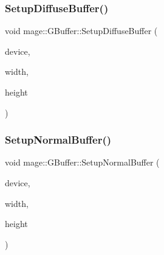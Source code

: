 \hypertarget{structmage_1_1_g_buffer_a80672c9a8faebe7c00e26040e19d03b8}{}\label{structmage_1_1_g_buffer_a80672c9a8faebe7c00e26040e19d03b8} 
\subsubsection{\texorpdfstring{Setup\+Diffuse\+Buffer()}{SetupDiffuseBuffer()}}
{\footnotesize\ttfamily void mage\+::\+G\+Buffer\+::\+Setup\+Diffuse\+Buffer (\begin{DoxyParamCaption}\item[{I\+D3\+D11\+Device2 $\ast$}]{device,  }\item[{\hyperlink{namespacemage_af2b398bf98eb10351f49cad73fe2cc73}{u32}}]{width,  }\item[{\hyperlink{namespacemage_af2b398bf98eb10351f49cad73fe2cc73}{u32}}]{height }\end{DoxyParamCaption})\hspace{0.3cm}{\ttfamily [private]}}

\hypertarget{structmage_1_1_g_buffer_a04f953ae48d8732d5dd6df24daf70f5a}{}\label{structmage_1_1_g_buffer_a04f953ae48d8732d5dd6df24daf70f5a} 
\subsubsection{\texorpdfstring{Setup\+Normal\+Buffer()}{SetupNormalBuffer()}}
{\footnotesize\ttfamily void mage\+::\+G\+Buffer\+::\+Setup\+Normal\+Buffer (\begin{DoxyParamCaption}\item[{I\+D3\+D11\+Device2 $\ast$}]{device,  }\item[{\hyperlink{namespacemage_af2b398bf98eb10351f49cad73fe2cc73}{u32}}]{width,  }\item[{\hyperlink{namespacemage_af2b398bf98eb10351f49cad73fe2cc73}{u32}}]{height }\end{DoxyParamCaption})\hspace{0.3cm}{\ttfamily [private]}}

\hypertarget{structmage_1_1_g_buffer_a6681f3e4cd4eef5d813b1ba69ca90bd5}{}\label{structmage_1_1_g_buffer_a6681f3e4cd4eef5d813b1ba69ca90bd5} 
